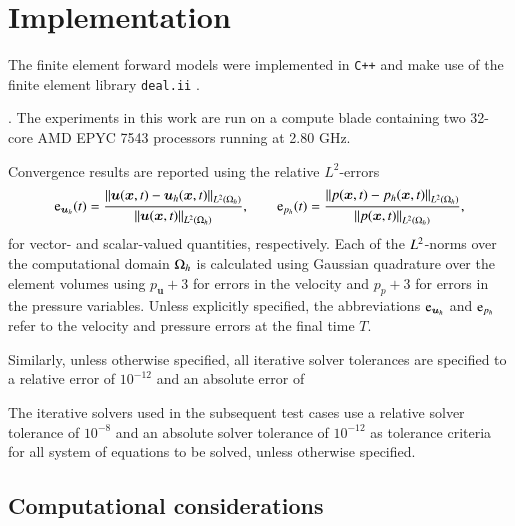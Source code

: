 \section{Implementation} \label{sec:implementation_details}

The finite element forward models were implemented in \texttt{C++} and make use of the finite element library \texttt{deal.ii} \cite{dealII93}.

. 
The experiments in this work are run on a compute blade containing two 32-core AMD EPYC 7543 processors running at 2.80 GHz.

Convergence results are reported using the relative $L^2$-errors 
\begin{equation}
  \text{e}_{\bm{u}_h}(t) = \frac{ \left\lVert \bm{u}(\bm{x}, t) - \bm{u}_h(\bm{x}, t)\right\rVert_{L^2(\Omega_h)} }{ \left\lVert \bm{u}(\bm{x}, t) \right\rVert_{L^2(\Omega_h)} }, \qquad 
  \text{e}_{p_h}(t) =\frac{ \left\lVert p(\bm{x}, t) - p_h(\bm{x}, t)\right\rVert_{L^2(\Omega_h)} }{ \left\lVert p(\bm{x}, t) \right\rVert_{L^2(\Omega_h)} },
\end{equation}
for vector- and scalar-valued quantities, respectively. Each of the $L^2$-norms over the computational domain $\Omega_h$ is calculated using Gaussian quadrature over the element volumes using $p_{\bm{u}} + 3$ for errors in the velocity and $p_{p} + 3$ for errors in the pressure variables.
Unless explicitly specified, the abbreviations $\text{e}_{\bm{u}_h}$ and $\text{e}_{p_h}$ refer to the velocity and pressure errors at the final time $T$.

Similarly, unless otherwise specified, all iterative solver tolerances are specified to a relative error of $10^{-12}$ and an absolute error of 

The iterative solvers used in the subsequent test cases use a relative solver tolerance of $10^{-8}$ and an absolute solver tolerance of $10^{-12}$ as tolerance criteria for all system of equations to be solved, unless otherwise specified.

\subsection{Computational considerations}
\label{sec:computational}

